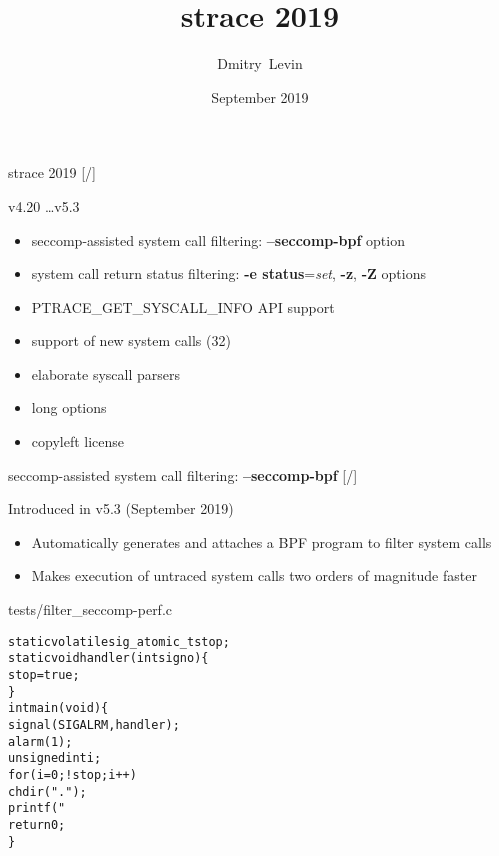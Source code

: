 \documentclass[unicode,aspectratio=169]{beamer}
\title{\Huge strace 2019}
\author{\Huge Dmitry~Levin}
\date{\Large September 2019}
\begin{document}
\begin{frame}
\titlepage
\end{frame}

\begin{frame}{strace 2019 \hfill [\insertframenumber/\inserttotalframenumber]}
\Large
\begin{block}{v4.20 \ldots v5.3}
\begin{itemize}
\item seccomp-assisted system call filtering: \textbf{--seccomp-bpf} option
\item system call return status filtering: \textbf{-e status}=\textit{set}, \textbf{-z}, \textbf{-Z} options
\item PTRACE\_GET\_SYSCALL\_INFO API support
\item support of new system calls (32)
\item elaborate syscall parsers
\item long options
\item copyleft license
\end{itemize}
\end{block}
\end{frame}

\begin{frame}[fragile]{seccomp-assisted system call filtering: \textbf{--seccomp-bpf} \hfill [\insertframenumber/\inserttotalframenumber]}
\large
\begin{block}{Introduced in v5.3 (September 2019)}
\begin{itemize}
\item Automatically generates and attaches a BPF program to filter system calls
\item Makes execution of untraced system calls two orders of magnitude faster
\end{itemize}
\end{block}

\begin{block}{tests/filter\_seccomp-perf.c}
\scriptsize
\begin{alltt}
static volatile sig_atomic_t stop;
static void handler(int signo) \{
    stop = true;
\}
int main(void) \{
    signal(SIGALRM, handler);
    alarm(1);
    unsigned int i;
    for (i = 0; !stop; i++)
        chdir(".");
    printf("%d{\textbackslash}n", i);
    return 0;
\}
\end{alltt}
\end{block}
\end{frame}
\end{document}
